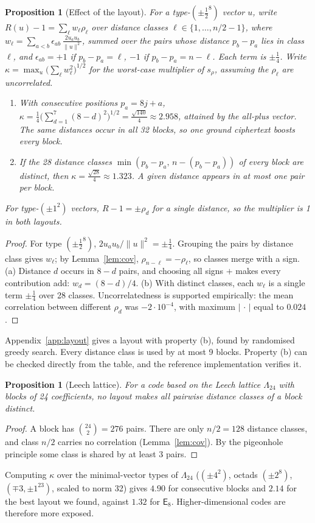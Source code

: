 \documentclass[11pt,a4paper]{article}
\newtheorem{proposition}[theorem]{Proposition}
\theoremstyle{definition}
\theoremstyle{remark}
\newcommand{\E}{\mathsf{E}_8}
\begin{document}
\begin{proposition}[Effect of the layout]\label{prop:layout}
For a type-$(\pm\frac12^8)$ vector $u$, write $R(u)-1=\sum_\ell w_\ell\rho_\ell$ over distance classes $\ell\in\{1,\dots,n/2-1\}$, where $w_\ell=\sum_{a<b}\epsilon_{ab}\,\frac{2u_au_b}{\|u\|^2}$, summed over the pairs whose distance $p_b-p_a$ lies in class $\ell$, and $\epsilon_{ab}=+1$ if $p_b-p_a=\ell$, $-1$ if $p_b-p_a=n-\ell$. Each term is $\pm\frac14$. Write $\kappa=\max_u\big(\sum_\ell w_\ell^2\big)^{1/2}$ for the worst-case multiplier of $s_\rho$, assuming the $\rho_\ell$ are uncorrelated.
\begin{enumerate}[label=(\alph*)]
\item With consecutive positions $p_a=8j+a$, $\kappa=\frac14\big(\sum_{d=1}^{7}(8-d)^2\big)^{1/2}=\frac{\sqrt{140}}4\approx2.958$, attained by the all-plus vector. The same distances occur in all 32 blocks, so one ground ciphertext boosts every block.
\item If the 28 distance classes $\min(p_b-p_a,\,n-(p_b-p_a))$ of every block are distinct, then $\kappa=\frac{\sqrt{28}}4\approx1.323$. A given distance appears in at most one pair per block.
\end{enumerate}
For type-$(\pm1^2)$ vectors, $R-1=\pm\rho_d$ for a single distance, so the multiplier is 1 in both layouts.
\end{proposition}
\begin{proof}
For type $(\pm\frac12^8)$, $2u_au_b/\|u\|^2=\pm\frac14$. Grouping the pairs by distance class gives $w_\ell$; by Lemma~\ref{lem:cov}, $\rho_{n-\ell}=-\rho_\ell$, so classes merge with a sign. (a) Distance $d$ occurs in $8-d$ pairs, and choosing all signs $+$ makes every contribution add: $w_d=(8-d)/4$. (b) With distinct classes, each $w_\ell$ is a single term $\pm\frac14$ over 28 classes. Uncorrelatedness is supported empirically: the mean correlation between different $\rho_d$ was $-2\cdot10^{-4}$, with maximum $|\,\cdot\,|$ equal to $0.024$.
\end{proof}

Appendix~\ref{app:layout} gives a layout with property (b), found by randomised greedy search. Every distance class is used by at most 9 blocks. Property (b) can be checked directly from the table, and the reference implementation verifies it.

\begin{proposition}[Leech lattice]\label{prop:leech}
For a code based on the Leech lattice $\Lambda_{24}$ with blocks of 24 coefficients, no layout makes all pairwise distance classes of a block distinct.
\end{proposition}
\begin{proof}
A block has $\binom{24}{2}=276$ pairs. There are only $n/2=128$ distance classes, and class $n/2$ carries no correlation (Lemma~\ref{lem:cov}). By the pigeonhole principle some class is shared by at least 3 pairs.
\end{proof}
Computing $\kappa$ over the minimal-vector types of $\Lambda_{24}$ ($(\pm4^2)$, octads $(\pm2^8)$, $(\mp3,\pm1^{23})$, scaled to norm 32) gives $4.90$ for consecutive blocks and $2.14$ for the best layout we found, against $1.32$ for $\E$. Higher-dimensional codes are therefore more exposed.
\end{document}
